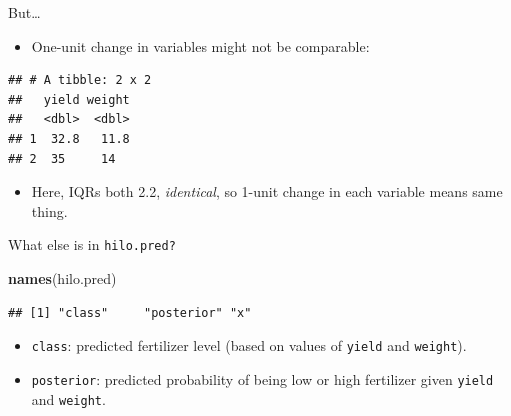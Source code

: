 \documentclass[ignorenonframetext,]{beamer}
\newenvironment{Shaded}{\begin{snugshade}}{\end{snugshade}}
\newcommand{\FloatTok}[1]{\textcolor[rgb]{0.00,0.00,0.81}{#1}}
\newcommand{\KeywordTok}[1]{\textcolor[rgb]{0.13,0.29,0.53}{\textbf{#1}}}
\newcommand{\NormalTok}[1]{#1}
\newcommand{\OperatorTok}[1]{\textcolor[rgb]{0.81,0.36,0.00}{\textbf{#1}}}
\newcommand{\StringTok}[1]{\textcolor[rgb]{0.31,0.60,0.02}{#1}}
\providecommand{\tightlist}{%
  \setlength{\itemsep}{0pt}\setlength{\parskip}{0pt}}
\begin{document}
\begin{frame}[fragile]{But\ldots}
\protect\hypertarget{but-2}{}

\begin{itemize}
\tightlist
\item
  One-unit change in variables might not be comparable:
\end{itemize}

\begin{Shaded}
\end{Shaded}

\begin{verbatim}
## # A tibble: 2 x 2
##   yield weight
##   <dbl>  <dbl>
## 1  32.8   11.8
## 2  35     14
\end{verbatim}

\begin{itemize}
\tightlist
\item
  Here, IQRs both 2.2, \emph{identical}, so 1-unit change in each
  variable means same thing.
\end{itemize}

\end{frame}

\begin{frame}[fragile]{What else is in \texttt{hilo.pred?}}
\protect\hypertarget{what-else-is-in-hilo.pred}{}

\small

\begin{Shaded}
\begin{Highlighting}[]
\KeywordTok{names}\NormalTok{(hilo.pred)}
\end{Highlighting}
\end{Shaded}

\begin{verbatim}
## [1] "class"     "posterior" "x"
\end{verbatim}

\normalsize

\begin{itemize}
\item
  \texttt{class}: predicted fertilizer level (based on values of
  \texttt{yield} and \texttt{weight}).
\item
  \texttt{posterior}: predicted probability of being low or high
  fertilizer given \texttt{yield} and \texttt{weight}.
\end{itemize}

\end{frame}
\end{document}
